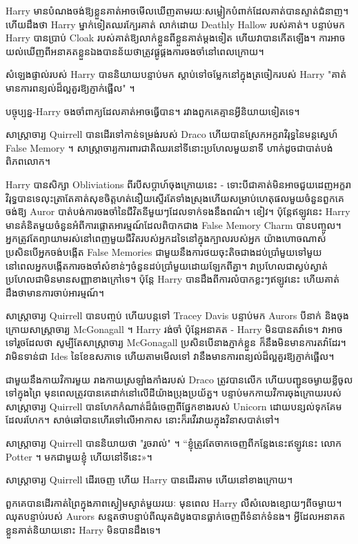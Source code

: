 Harry មានបំណងចង់ឱ្យខ្លួនគាត់អាចមើលឃើញតាមរយៈសម្លៀកបំពាក់ដែលគាត់បានស្ទាត់ជំនាញ។ ហើយដឹងថា Harry ម្នាក់ទៀតឈរក្បែរគាត់ លាក់ដោយ Deathly Hallow របស់គាត់។ បន្ទាប់មក Harry បានប្រាប់ Cloak របស់គាត់ឱ្យលាក់ខ្លួនពីខ្លួនគាត់ម្តងទៀត ហើយវាបានកើតឡើង។ ការ​អាច​យល់​ឃើញ​ពី​អនាគត​ខ្លួន​ឯង​បាន​ន័យ​ថា​ត្រូវ​ផ្គូផ្គង​ការ​ចងចាំ​នៅ​ពេល​ក្រោយ។

សំឡេងផ្ទាល់របស់ Harry បាននិយាយបន្ទាប់មក ស្តាប់ទៅចម្លែកនៅក្នុងត្រចៀករបស់ Harry "គាត់មានការពន្យល់ដ៏ល្អគួរឱ្យភ្ញាក់ផ្អើល" ។

បច្ចុប្បន្ន-Harry ចងចាំពាក្យដែលគាត់អាចធ្វើបាន។ រវាងពួកគេគ្មានអ្វីនិយាយទៀតទេ។

សាស្ត្រាចារ្យ Quirrell បានដើរទៅកាន់ទម្រង់របស់ Draco ហើយបានស្រែកអក្ខរាវិរុទ្ធនៃមន្តស្នេហ៍ False Memory ។ សាស្ត្រាចារ្យការពារជាតិឈរនៅទីនោះប្រហែលមួយនាទី ហាក់ដូចជាបាត់បង់ពិភពលោក។

Harry បានសិក្សា Obliviations ពីរបីសប្តាហ៍ចុងក្រោយនេះ - ទោះបីជាគាត់មិនអាចជួយដេញអក្ខរាវិរុទ្ធបានទេលុះត្រាតែគាត់សុខចិត្តហត់នឿយស្ទើរតែទាំងស្រុងហើយសម្រាប់ហេតុផលមួយចំនួនពួកគេចង់ឱ្យ Auror បាត់បង់ការចងចាំនៃជីវិតនីមួយៗដែលទាក់ទងនឹងពណ៌។ ខៀវ។ ប៉ុន្តែឥឡូវនេះ Harry មានគំនិតមួយចំនួនអំពីការផ្តោតអារម្មណ៍ដែលពិបាកជាង False Memory Charm បានបញ្ចូល។ អ្នកត្រូវតែព្យាយាមរស់នៅពេញមួយជីវិតរបស់អ្នកដទៃនៅក្នុងក្បាលរបស់អ្នក យ៉ាងហោចណាស់ប្រសិនបើអ្នកចង់បង្កើត False Memories ជាមួយនឹងការថយចុះតិចជាងដប់ប្រាំមួយទៅមួយ នៅពេលអ្នកបង្កើតការចងចាំសំខាន់ៗចំនួនដប់ប្រាំមួយដោយឡែកពីគ្នា។ វាប្រហែលជាស្ងប់ស្ងាត់ ប្រហែលជាមិនមានសញ្ញាខាងក្រៅទេ។ ប៉ុន្តែ Harry បានដឹងពីការលំបាកខ្លះៗឥឡូវនេះ ហើយគាត់ដឹងថាមានការចាប់អារម្មណ៍។

សាស្ត្រាចារ្យ Quirrell បានបញ្ចប់ ហើយបន្តទៅ Tracey Davis បន្ទាប់មក Aurors បីនាក់ និងចុងក្រោយសាស្រ្តាចារ្យ McGonagall ។ Harry រង់ចាំ ប៉ុន្តែអនាគត - Harry មិនបានតវ៉ាទេ។ វាអាចទៅរួចដែលថា សូម្បីតែសាស្រ្តាចារ្យ McGonagall ប្រសិនបើនាងភ្ញាក់ខ្លួន ក៏នឹងមិនមានការតវ៉ាដែរ។ វាមិនទាន់ជា Ides នៃខែឧសភាទេ ហើយតាមមើលទៅ វានឹងមានការពន្យល់ដ៏ល្អគួរឱ្យភ្ញាក់ផ្អើល។

ជាមួយនឹងកាយវិការមួយ រាងកាយស្រឡាំងកាំងរបស់ Draco ត្រូវបានលើក ហើយបញ្ជូនចម្ងាយខ្លីចូលទៅក្នុងព្រៃ មុនពេលត្រូវបានគេដាក់នៅលើដីយ៉ាងប្រុងប្រយ័ត្ន។ បន្ទាប់មកកាយវិការចុងក្រោយរបស់សាស្រ្តាចារ្យ Quirrell បានហែកកំណាត់ដ៏ធំចេញពីផ្នែកខាងរបស់ Unicorn ដោយបន្សល់ទុកគែមដែលរហែក។ សាច់​ឆៅ​បាន​ហើរ​ទៅ​លើ​អាកាស នោះ​ក៏​រវើរវាយ​ក្នុង​វិនាស​បាត់​ទៅ។

សាស្រ្តាចារ្យ Quirrell បាននិយាយថា "រួចរាល់" ។ “ខ្ញុំត្រូវតែចាកចេញពីកន្លែងនេះឥឡូវនេះ លោក ~ Potter ។ មក​ជាមួយ​ខ្ញុំ ហើយ​នៅ​ទី​នេះ»។

សាស្ត្រាចារ្យ Quirrell ដើរចេញ ហើយ Harry បានដើរតាម ហើយនៅខាងក្រោយ។

ពួកគេបានដើរកាត់ព្រៃក្នុងភាពស្ងៀមស្ងាត់មួយរយៈ មុនពេល Harry លឺសំលេងខ្សោយៗពីចម្ងាយ។ ឈុតបន្ទាប់របស់ Aurors សន្មតថាបន្ទាប់ពីឈុតដំបូងបានធ្លាក់ចេញពីទំនាក់ទំនង។ អ្វី​ដែល​អនាគត​ខ្លួន​គាត់​និយាយ​នោះ Harry មិន​បាន​ដឹង​ទេ។


